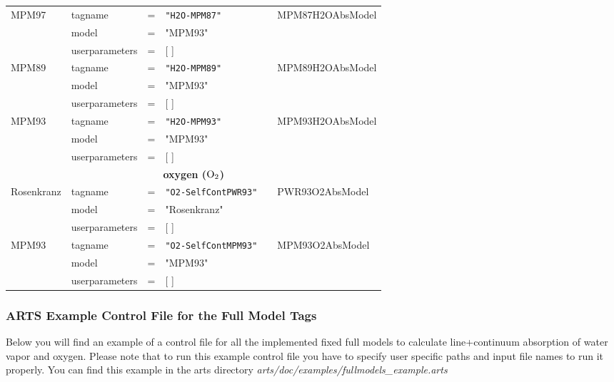 \begin{landscape}
\begin{longtable}{llllll}
 MPM97       & tagname &=& {\tt "H2O-MPM87"}   & \citet{liebeandlayton:87} & MPM87H2OAbsModel\\
             & model &=& "MPM93" &   &  \\ 
             & userparameters &=& [ ] &   & \\
 MPM89       & tagname &=& {\tt "H2O-MPM89"}   & \citet{liebe:89} & MPM89H2OAbsModel\\
             & model &=& "MPM93" &   &  \\ 
             & userparameters &=& [ ] &   & \\
 MPM93       & tagname &=& {\tt "H2O-MPM93"}   & \citet{liebeetal:93} & MPM93H2OAbsModel\\
             & model &=& "MPM93" &   &  \\ 
             & userparameters &=& [ ] &   & \\
 \hline
 \multicolumn{6}{c}{{\bf oxygen ($\mbox{O}_2$)}}\\
 \hline
 Rosenkranz  & tagname &=& {\tt "O2-SelfContPWR93"} & \citet{pwr:93} & PWR93O2AbsModel\\
             & model &=& "Rosenkranz" &   &  \\ 
             & userparameters &=& [ ] &   & \\
 MPM93       & tagname &=& {\tt "O2-SelfContMPM93"} & \citet{liebeetal:93} & MPM93O2AbsModel\\
             & model &=& "MPM93" &   &  \\ 
             & userparameters &=& [ ] &   & \\
 \hline
 \end{longtable}
 \setlength{\LTcapwidth}{0.8\textwidth}
\end{landscape}






\subsubsection{ARTS Example Control File for the Full Model Tags}
\label{leveld:ArtsFullModelExampleControlFile}
Below you will find an example of a control file for all 
the implemented fixed full models to calculate line+continuum
absorption of water vapor and oxygen. Please note that to 
run this example control file you have to specify user 
specific paths and input file names to run it properly. 
You can find this example in the arts directory 
{\it arts/doc/examples/fullmodels\_example.arts}


